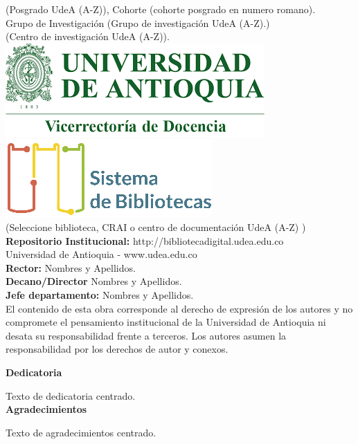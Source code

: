 \vspace{1cm}
\noindent (Posgrado UdeA (A-Z)), Cohorte (cohorte posgrado en numero romano). \\
Grupo de Investigación (Grupo de investigación UdeA (A-Z).)  \\
(Centro de investigación UdeA (A-Z)). \\[1cm]
%
\includegraphics[scale=0.35]{imagenes/escudo_udea_vice.png}\quad
\includegraphics{imagenes/sis_biblo.png}\\
%
(Seleccione biblioteca, CRAI o centro de documentación UdeA (A-Z) )\\[1cm]
%
\textbf{Repositorio Institucional:} http://bibliotecadigital.udea.edu.co\\[1cm]
%
Universidad de Antioquia - www.udea.edu.co\\[0.5cm]
\textbf{Rector:} Nombres y Apellidos.\\
\textbf{Decano/Director} Nombres y Apellidos.\\
\textbf{Jefe departamento:} Nombres y Apellidos.\\[1cm]
%
El contenido de esta obra corresponde al derecho de expresión de los autores y no compromete el pensamiento institucional de la Universidad de Antioquia ni desata su responsabilidad frente a terceros. Los autores asumen la responsabilidad por los derechos de autor y conexos.



\newpage
    \thispagestyle{empty}
\begin{center}
    \textbf{Dedicatoria}
    
    Texto de dedicatoria centrado.\\[2cm]
    
    \textbf{Agradecimientos}
    
    Texto de agradecimientos centrado.    
\end{center} 




